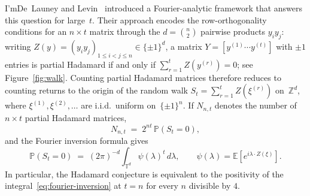 \documentclass[11pt]{article}
\theoremstyle{definition}
\newcommand{\E}{\mathbb{E}}
\newcommand{\Prb}{\mathbb{P}}
\newcommand{\TT}{\mathbb{T}}
\begin{document}
I'mDe~Launey and Levin~\cite{DL10} introduced a Fourier-analytic framework that answers this question for large~\(t\). Their approach encodes the row-orthogonality conditions for an \(n\times t\) matrix through the \(d=\binom{n}{2}\) pairwise products \(y_iy_j\): writing \(Z(y)=(y_iy_j)_{1\le i<j\le n}\in\{\pm1\}^d\), a matrix \(Y=[y^{(1)}\cdots y^{(t)}]\) with \(\pm1\) entries is partial Hadamard if and only if \(\sum_{r=1}^t Z(y^{(r)})=0\); see Figure~\ref{fig:walk}. Counting partial Hadamard matrices therefore reduces to counting returns to the origin of the random walk \(S_t=\sum_{r=1}^t Z(\xi^{(r)})\) on~\(\mathbb{Z}^d\), where \(\xi^{(1)},\xi^{(2)},\dots\) are i.i.d.\ uniform on~\(\{\pm1\}^n\). If \(N_{n,t}\) denotes the number of \(n\times t\) partial Hadamard matrices,
\begin{equation}\label{eq:counting-identity}
  N_{n,t} \;=\; 2^{nt}\,\Prb(S_t=0),
\end{equation}
and the Fourier inversion formula \cite[P3, p.~57]{Spi1976} gives
\begin{equation}\label{eq:fourier-inversion}
  \Prb(S_t=0)
  \;=\;
  (2\pi)^{-d}\int_{\TT^d}\psi(\lambda)^t\,d\lambda,
  \qquad
  \psi(\lambda)=\E[e^{i\lambda\cdot Z(\xi)}].
\end{equation}
In particular, the Hadamard conjecture is equivalent to the positivity of the integral~\eqref{eq:fourier-inversion} at \(t=n\) for every $n$ divisible by $4$.
\end{document}
